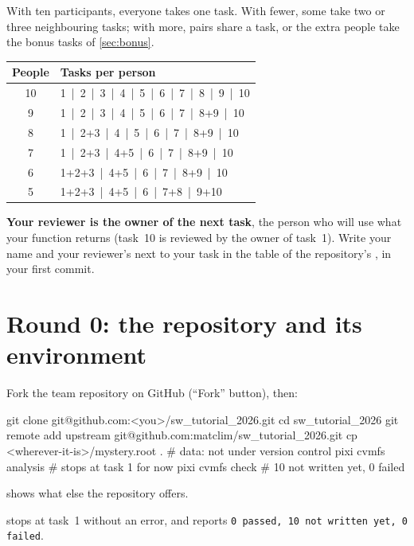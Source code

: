 With ten participants, everyone takes one task. With fewer, some take two or
three neighbouring tasks; with more, pairs share a task, or the extra people
take the bonus tasks of \cref{sec:bonus}.

\begin{center}\small
\begin{tabular}{c l}
\toprule
People & Tasks per person \\
\midrule
10 & 1 \,|\, 2 \,|\, 3 \,|\, 4 \,|\, 5 \,|\, 6 \,|\, 7 \,|\, 8 \,|\, 9 \,|\, 10 \\
9  & 1 \,|\, 2 \,|\, 3 \,|\, 4 \,|\, 5 \,|\, 6 \,|\, 7 \,|\, 8+9 \,|\, 10 \\
8  & 1 \,|\, 2+3 \,|\, 4 \,|\, 5 \,|\, 6 \,|\, 7 \,|\, 8+9 \,|\, 10 \\
7  & 1 \,|\, 2+3 \,|\, 4+5 \,|\, 6 \,|\, 7 \,|\, 8+9 \,|\, 10 \\
6  & 1+2+3 \,|\, 4+5 \,|\, 6 \,|\, 7 \,|\, 8+9 \,|\, 10 \\
5  & 1+2+3 \,|\, 4+5 \,|\, 6 \,|\, 7+8 \,|\, 9+10 \\
\bottomrule
\end{tabular}
\end{center}

\textbf{Your reviewer is the owner of the next task}, the person who will use
what your function returns (task~10 is reviewed by the owner of task~1).
Write your name and your reviewer's next to your task in the table of the
repository's , in your first commit.

\section{Round 0: the repository and its environment}
\label{sec:teamworkflow}

Fork the team repository on GitHub (``Fork'' button), then:
\begin{shell}
git clone git@github.com:<you>/sw_tutorial_2026.git
cd sw_tutorial_2026
git remote add upstream git@github.com:matclim/sw_tutorial_2026.git
cp <wherever-it-is>/mystery.root .          # data: not under version control
pixi cvmfs analysis                         # stops at task 1 for now
pixi cvmfs check                            # 10 not written yet, 0 failed
\end{shell}
 shows what else the repository offers.

\begin{checkpoint}
 stops at task~1 without an error, and
 reports \texttt{0 passed, 10 not written yet, 0 failed}.
\end{checkpoint}

